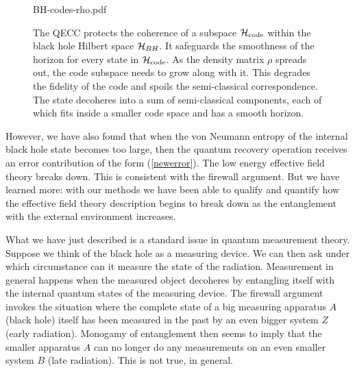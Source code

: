 \documentclass[12pt]{article}%
\begin{document}
\begin{figure}[t]
\begin{center}
{BH-codes-rho.pdf}
\end{center}
\begin{center}
\caption{\small
{
The QECC protects the coherence of a subspace ${\cal H}_{\rm code}$ within the black hole Hilbert space ${\cal H}_{BH}$. It safeguards the smoothness of the horizon for every state in ${\cal H}_{\rm code}$. As the density matrix 
$\rho$ spreads out, the code subspace  needs to grow along with it. This degrades the fidelity of the code and spoils the semi-classical correspondence. The state decoheres into a sum of semi-classical components, each of which fits inside a smaller code space and has a smooth horizon.}}
\end{center}
\vspace{-0.5cm}
\end{figure} 

However, we have also found that when the von Neumann entropy of the internal black hole state becomes too large, then the quantum recovery 
operation receives an error contribution of the form (\ref{newerror}). The low energy effective field theory breaks down.
This is consistent with the firewall argument. But we have learned more: with our methods we have been able to qualify and quantify how
 the effective field theory description begins to break down as the entanglement with the external environment increases.

What we have just described is a standard issue in quantum measurement theory. Suppose we think of the black hole as a measuring device.  
We can then  ask under which circumstance can it measure the state of the radiation. 
Measurement in general happens when the measured object decoheres by entangling itself with the internal quantum states of the measuring device. 
The firewall argument invokes the situation where the complete state of a big measuring apparatus $A$ (black hole) itself has been measured
in the past by an even bigger system $Z$ (early radiation). Monogamy of entanglement then seems to imply that the smaller apparatus $A$ can 
no longer do  any measurements on an even smaller system $B$ (late radiation). This is not true, in general.
\end{document}
